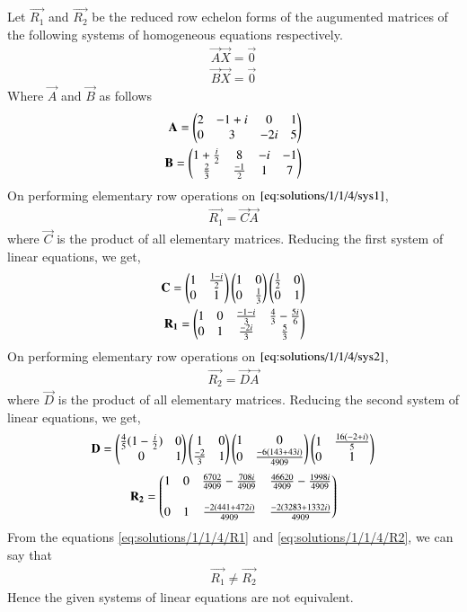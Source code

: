 Let $\vec{R_1}$ and  $\vec{R_2}$ be the reduced row echelon forms of the  augumented matrices of the following systems of homogeneous equations respectively.
\begin{align}
\vec{A}\vec{X}=\vec{0}\label{eq:solutions/1/1/4/f1}\\
\vec{B}\vec{X}=\vec{0}\label{eq:solutions/1/1/4/f2}
\end{align}
Where $\vec{A}$ and $\vec{B}$ as follows
\begin{align}
\mathbf{A}=\begin{pmatrix}2&-1+i&0&1\\0&3&-2i&5\end{pmatrix}\label{eq:solutions/1/1/4/sys1}\\
\mathbf{B}=\begin{pmatrix}1+\frac{i}{2}&8&-i&-1\\\frac{2}{3}&\frac{-1}{2}&1&7\end{pmatrix}\label{eq:solutions/1/1/4/sys2}
\end{align}
On performing elementary row operations on $\eqref{eq:solutions/1/1/4/sys1}$,
\begin{align}
\vec{R_1}=\vec{C}\vec{A}
\end{align}
where $\vec{C}$ is the product of all elementary matrices. Reducing the first system of linear equations, we get,
\begin{align}
\mathbf{C}=\begin{pmatrix}1&\frac{1-i}{2}\\0&1\end{pmatrix}\begin{pmatrix}1&0\\0&\frac{1}{3}\end{pmatrix}\begin{pmatrix}\frac{1}{2}&0\\0&1\end{pmatrix}\\
\mathbf{R_1}=\begin{pmatrix}1&0&\frac{-1-i}{3}&\frac{4}{3}-\frac{5i}{6}\\0&1&\frac{-2i}{3}&\frac{5}{3}\end{pmatrix}\label{eq:solutions/1/1/4/R1}
\end{align}
On performing elementary row operations on $\eqref{eq:solutions/1/1/4/sys2}$,
\begin{align}
\vec{R_2}=\vec{D}\vec{A}
\end{align}
where $\vec{D}$ is the product of all elementary matrices. Reducing the second system of linear equations, we get,
\begin{align}
\mathbf{D}=\begin{pmatrix}\frac{4}{5}(1-\frac{i}{2})&0\\0&1\end{pmatrix}\begin{pmatrix}1&0\\\frac{-2}{3}&1\end{pmatrix}\begin{pmatrix}1&0\\0&\frac{-6(143+43i)}{4909}\end{pmatrix}\begin{pmatrix}1&\frac{16(-2+i)}{5}\\0&1\end{pmatrix}
\end{align}
\begin{align}
\mathbf{R_2}=\begin{pmatrix}1&0&\frac{6702}{4909}-\frac{708i}{4909}&\frac{46620}{4909}-\frac{1998i}{4909}\\\\0&1&\frac{-2(441+472i)}{4909}&\frac{-2(3283+1332i)}{4909}\end{pmatrix}\label{eq:solutions/1/1/4/R2}
\end{align}
From the equations \eqref{eq:solutions/1/1/4/R1} and \eqref{eq:solutions/1/1/4/R2}, we can say that 
\begin{align}
\vec{R_1}\neq\vec{R_2}
\end{align}
Hence the given systems of linear equations are not equivalent.
